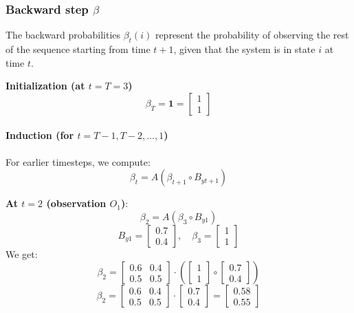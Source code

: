 \subsubsection{Backward step $\beta$}

The backward probabilities \( \beta_t(i) \) represent the probability of observing the rest of the sequence starting from time \( t+1 \), given that the system is in state \( i \) at time \( t \).

\textbf{Initialization (at \( t = T = 3\))}
  \[
  \beta_T = \mathbf{1} = \begin{bmatrix} 1 \\ 1 \end{bmatrix}
  \]

\paragraph{Induction (for \( t = T-1, T-2, \dots, 1 \))}
  
  For earlier timesteps, we compute:
  \[
  \beta_t = A (\beta_{t+1} \circ B_{yt+1})
  \]

  \textbf{At \( t = 2 \) (observation \( O_1 \))}:
  \[
  \beta_2 = A (\beta_3 \circ B_{y1})
  \]
  \[
  B_{y1} = \begin{bmatrix} 0.7 \\ 0.4 \end{bmatrix}, \quad \beta_3 = \begin{bmatrix} 1 \\ 1 \end{bmatrix}
  \]
  We get:
  \[
  \beta_2 = \begin{bmatrix} 0.6 & 0.4 \\ 0.5 & 0.5 \end{bmatrix} \cdot \left(\begin{bmatrix}
    1 \\ 1
  \end{bmatrix} \circ \begin{bmatrix}
    0.7 \\ 0.4 \end{bmatrix}\right) 
\] 
\[
\beta_2 = \begin{bmatrix} 0.6 & 0.4 \\ 0.5 & 0.5 \end{bmatrix} \cdot \begin{bmatrix} 0.7 \\ 0.4 \end{bmatrix} = \begin{bmatrix} 0.58 \\ 0.55 \end{bmatrix}
  \]

